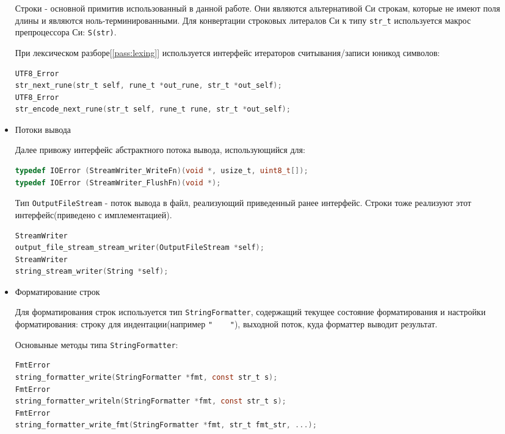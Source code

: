 \begin{itemize}
Строки - основной примитив использованный в данной работе. Они являются альтернативой Си строкам, которые не имеют поля длины и являются ноль-терминированными.
Для конвертации строковых литералов Си к типу \verb|str_t| используется макрос препроцессора Си: \verb|S(str)|.

При лексическом разборе[\ref{pass:lexing}] используется интерфейс итераторов считывания/записи юникод символов:
\begin{lstlisting}[language=c, caption={Функиции итерации считывания/записи строк}, label={primitives:str-iter-api}]
UTF8_Error
str_next_rune(str_t self, rune_t *out_rune, str_t *out_self);
UTF8_Error
str_encode_next_rune(str_t self, rune_t rune, str_t *out_self);
\end{lstlisting}


\item Потоки вывода

Далее привожу интерфейс абстрактного потока вывода, использующийся для:

\begin{lstlisting}[language=c, caption={Интерфейс абстрактного потока вывода}, label={primitives:io-api}]
typedef IOError (StreamWriter_WriteFn)(void *, usize_t, uint8_t[]);
typedef IOError (StreamWriter_FlushFn)(void *);
\end{lstlisting}


Тип \verb|OutputFileStream| - поток вывода в файл, реализующий приведенный ранее интерфейс.
Строки тоже реализуют этот интерфейс(приведено с имплементацией).

\begin{lstlisting}[language=c, caption={Реализация интерфейса потока вывода другими типами}]
StreamWriter
output_file_stream_stream_writer(OutputFileStream *self);
StreamWriter
string_stream_writer(String *self);
\end{lstlisting}

\item Форматирование строк

Для форматирования строк используется тип \verb|StringFormatter|, содержащий текущее состояние форматирования и настройки форматирования:
строку для индентации(например \verb|"    "|), выходной поток, куда форматтер выводит результат.

Основыные методы типа \verb|StringFormatter|:
\begin{lstlisting}[language=c, caption={Интерфейс объекта форматирования строк}, label={primitives:string-formatter-api}]
FmtError
string_formatter_write(StringFormatter *fmt, const str_t s);
FmtError
string_formatter_writeln(StringFormatter *fmt, const str_t s);
FmtError
string_formatter_write_fmt(StringFormatter *fmt, str_t fmt_str, ...);
\end{lstlisting}


\end{itemize}

